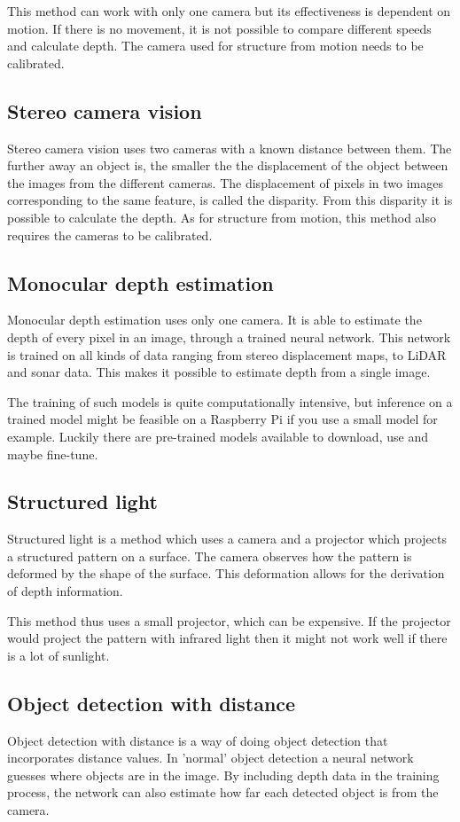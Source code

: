 \documentclass{article}[a4paper]
\begin{document}
This method can work with only one camera but its effectiveness is dependent on motion. If there is no movement, it is not possible to compare different speeds and calculate depth. The camera used for structure from motion needs to be calibrated.

\subsection{Stereo camera vision}
Stereo camera vision uses two cameras with a known distance between them. The further away an object is, the smaller the the displacement of the object between the images from the different cameras. The displacement of pixels in two images corresponding to the same feature, is called the disparity. From this disparity it is possible to calculate the depth. As for structure from motion, this method also requires the cameras to be calibrated.

\subsection{Monocular depth estimation}
Monocular depth estimation uses only one camera. It is able to estimate the depth of every pixel in an image, through a trained neural network. This network is trained on all kinds of data ranging from stereo displacement maps, to LiDAR and sonar data. This makes it possible to estimate depth from a single image.

The training of such models is quite computationally intensive, but inference on a trained model might be feasible on a Raspberry Pi if you use a small model for example. Luckily there are pre-trained models available to download, use and maybe fine-tune.

\subsection{Structured light}
Structured light is a method which uses a camera and a projector which projects a structured pattern on a surface. The camera observes how the pattern is deformed by the shape of the surface. This deformation allows for the derivation of depth information.

This method thus uses a small projector, which can be expensive. If the projector would project the pattern with infrared light then it might not work well if there is a lot of sunlight.

\subsection{Object detection with distance}
Object detection with distance is a way of doing object detection that incorporates distance values. In 'normal' object detection a neural network guesses where objects are in the image. By including depth data in the training process, the network can also estimate how far each detected object is from the camera.
\end{document}

